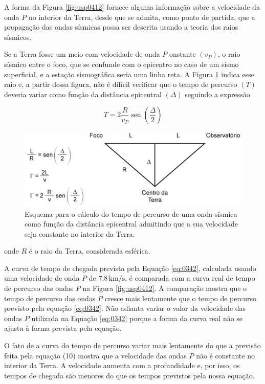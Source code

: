\documentclass[]{book}
\theoremstyle{definition}
\theoremstyle{definition}
\theoremstyle{definition}
\theoremstyle{remark}
\begin{document}
A forma da Figura \ref{fig:usp0412} fornece alguma informação sobre a velocidade da onda \(P\) no interior da Terra, desde que se admita, como ponto de partida, que a propagação das ondas sísmicas possa ser descrita usando a teoria dos raios sísmicos.

Se a Terra fosse um meio com velocidade de onda \(P\) onstante \((v_P)\), o raio sísmico entre o foco, que se confunde com o epicentro no caso de um sismo superficial, e a estação sismográfica seria uma linha reta. A Figura \ref{fig:usp0413} indica esse raio e, a partir dessa figura, não é difícil verificar que o tempo de percurso \((T)\) deveria variar como função da distância epicentral \((\Delta)\) seguindo a expressão

\begin{equation}
T=2 \frac{R}{v_{P}} \operatorname{sen}\left(\frac{\Delta}{2}\right)  \label{eq:0342}
\end{equation}

\begin{figure}

{\centering \includegraphics[width=0.5\linewidth]{fig/figU13} 

}

\caption{Esquema para o cálculo do tempo de percurso de uma onda sísmica como função da distância epicentral admitindo que a sua velocidade seja constante no interior da Terra.}\label{fig:usp0413}
\end{figure}

onde \(R\) é o raio da Terra, considerada esférica.

A curva de tempo de chegada prevista pela Equação \eqref{eq:0342}, calculada usando uma velocidade de onda \(P\) de \(7.8\,\mathrm{km/s}\), é comparada com a curva real de tempo de percurso das ondas \(P\) na Figura \ref{fig:usp0412}. A comparação mostra que o tempo de percurso das ondas \(P\) cresce mais lentamente que o tempo de percurso previsto pela equação \eqref{eq:0342}. Não adianta variar o valor da velocidade das ondas \(P\) utilizada na Equação \eqref{eq:0342} porque a forma da curva real não se ajusta à forma prevista pela equação.

O fato de a curva do tempo de percurso variar mais lentamente do que a previsão feita pela equação (10) mostra que a velocidade das ondas \(P\) não é constante no interior da Terra. A velocidade aumenta com a profundidade e, por isso, os tempos de chegada são menores do que os tempos previstos pela nossa equação.
\end{document}
